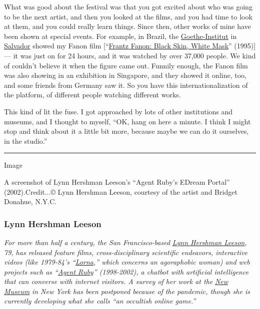 What was good about the festival was that you got excited about who was
going to be the next artist, and then you looked at the films, and you
had time to look at them, and you could really learn things. Since then,
other works of mine have been shown at special events. For example, in
Brazil, the
\href{https://www.goethe.de/ins/br/pt/sta/sal.html}{Goethe-Institut} in
\href{https://www.nytimes3xbfgragh.onion/2019/01/24/travel/what-to-do-in-salvador-brazil.html}{Salvador}
showed my Fanon film
{[}``\href{https://www.isaacjulien.com/projects/frantz-fanon-black-skin-white-mask/}{Frantz
Fanon: Black Skin, White Mask}'' (1995){]} --- it was just on for 24
hours, and it was watched by over 37,000 people. We kind of couldn't
believe it when the figure came out. Funnily enough, the Fanon film was
also showing in an exhibition in Singapore, and they showed it online,
too, and some friends from Germany saw it. So you have this
internationalization of the platform, of different people watching
different works.

This kind of lit the fuse. I got approached by lots of other
institutions and museums, and I thought to myself, ``OK, hang on here a
minute. I think I might stop and think about it a little bit more,
because maybe we can do it ourselves, in the studio.''

\begin{center}\rule{0.5\linewidth}{\linethickness}\end{center}

Image

A screenshot of Lynn Hershman Leeson's ``Agent Ruby's EDream Portal''
(2002).Credit...© Lynn Hershman Leeson, courtesy of the artist and
Bridget Donahue, N.Y.C.

\hypertarget{lynn-hershman-leeson}{%
\subsubsection{\texorpdfstring{\textbf{Lynn Hershman
Leeson}}{Lynn Hershman Leeson}}\label{lynn-hershman-leeson}}

\emph{For more than half a century, the San Francisco-based}
\href{https://www.nytimes3xbfgragh.onion/2019/11/08/arts/design/Lynn-Hershman-Leeson-Shed-art-technology.html}{\emph{Lynn
Hershman Leeson}}\emph{, 79, has released feature films,
cross-disciplinary scientific endeavors, interactive videos (like
1979-84's
``}\href{https://www.lynnhershman.com/lorna/}{\emph{Lorna}}\emph{,''
which concerns an agoraphobic woman) and web projects such as
``}\href{http://www.lynnhershman.com/agent-ruby/}{\emph{Agent
Ruby}}\emph{'' (1998-2002), a chatbot with artificial intelligence that
can converse with internet visitors. A survey of her work at the}
\href{https://www.nytimes3xbfgragh.onion/topic/organization/new-museum-of-contemporary-art}{\emph{New
Museum}} \emph{in New York has been postponed because of the pandemic,
though she is currently developing what she calls ``an occultish online
game.''}

